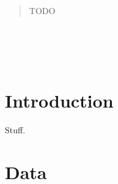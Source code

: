 





\begin{abstract}\noindent
TODO
\end{abstract}


\section*{~}\clearpage
\section{Introduction} \label{sec:intro}

Stuff.


\section{Data} \label{sec:data}


